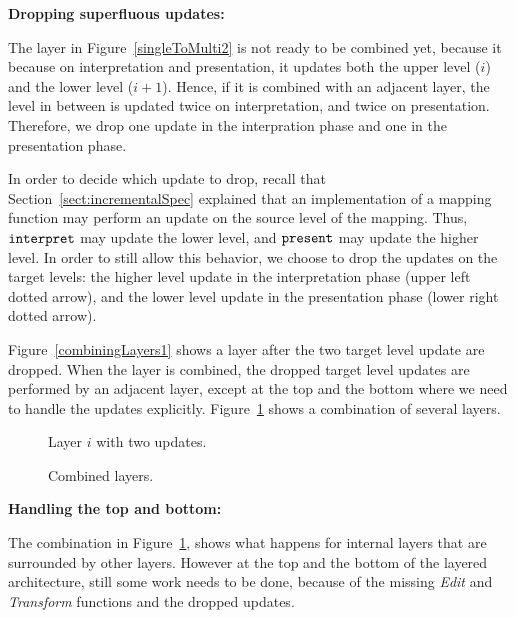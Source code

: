 \bigskip
{\bf Dropping superfluous updates:} 

The layer in Figure~\ref{singleToMulti2} is not ready to be combined yet, because it because on interpretation and presentation, it updates both the upper level ($i$) and the lower level ($i+1$). Hence, if it is combined with an adjacent layer, the level in between is updated twice on interpretation, and twice on presentation. Therefore, we drop one update in the interpration phase and one in the presentation phase. 

In order to decide which update to drop, recall that Section~\ref{sect:incrementalSpec} explained that an implementation of a mapping function may perform an update on the source level of the mapping. Thus, 
${\tt interpret}$ may update the lower level, and ${\tt present}$ may update the higher level. In order to still allow this behavior, we choose to drop the updates on the target levels: the higher level update in the interpretation phase (upper left dotted arrow), and the lower level update in the presentation phase (lower right dotted arrow). 

Figure~\ref{combiningLayers1} shows a layer after the two target level update are dropped. When the layer is combined, the dropped target level updates are performed by an adjacent layer, except at the top and the bottom where we need to handle the updates explicitly. Figure~\ref{combiningLayers2} shows a combination of several layers.

\begin{figure}[h]
  \hfill
  \begin{minipage}[b]{.45\textwidth}
    \begin{center}  
      \caption{Layer $i$ with two updates.} \label{combiningLayers1}
    \end{center}
  \end{minipage}
  \hfill
  \begin{minipage}[b]{.45\textwidth}
    \begin{center}  
      \caption{Combined layers.} \label{combiningLayers2}
    \end{center}
  \end{minipage}
  \hfill
\end{figure}


\bigskip
{\bf Handling the top and bottom:}

The combination in Figure~\ref{combiningLayers2}, shows what happens for internal layers that are surrounded by other layers. However at the top and the bottom of the layered architecture, still some work needs to be done, because of the missing {\em Edit} and {\em Transform} functions and the dropped updates. 

